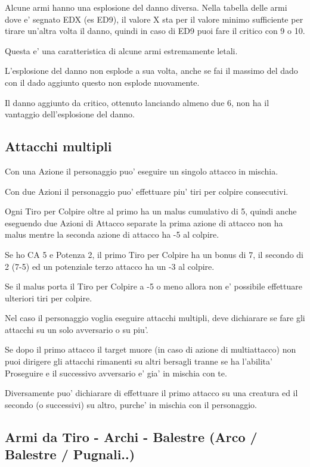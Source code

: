\documentclass[a4paper,11pt,twoside,openany]{book}
\begin{document}
Alcune armi hanno una esplosione del danno diversa. Nella tabella delle armi dove e' segnato EDX (es ED9), il valore X sta per il valore minimo sufficiente per tirare un'altra volta il danno, quindi in caso di ED9 puoi fare il critico con 9 o 10.

Questa e' una caratteristica di alcune armi estremamente letali.

L'esplosione del danno non esplode a sua volta, anche se fai il massimo del dado con il dado aggiunto questo non esplode nuovamente.

Il danno aggiunto da critico, ottenuto lanciando almeno due 6, non ha il vantaggio dell'esplosione del danno.

\subsection{Attacchi multipli}

Con una Azione il personaggio puo' eseguire un singolo attacco in mischia.

Con due Azioni il personaggio puo' effettuare piu' tiri per colpire consecutivi.

Ogni Tiro per Colpire oltre al primo ha un malus cumulativo di 5, quindi anche eseguendo due Azioni di Attacco separate la prima azione di attacco non ha malus mentre la seconda azione di attacco ha -5 al colpire.

Se ho CA 5 e Potenza 2, il primo Tiro per Colpire ha un bonus di 7, il secondo di 2 (7-5) ed un potenziale terzo attacco ha un -3 al colpire.

Se il malus porta il Tiro per Colpire a -5 o meno allora non e' possibile effettuare ulteriori tiri per colpire.

Nel caso il personaggio voglia eseguire attacchi multipli, deve dichiarare se fare gli attacchi su un solo avversario o su piu'.

Se dopo il primo attacco il target muore (in caso di azione di multiattacco) non puoi dirigere gli attacchi rimanenti su altri bersagli tranne se ha l'abilita' Proseguire e il successivo avversario e' gia' in mischia con te.

Diversamente puo' dichiarare di effettuare il primo attacco su una creatura ed il secondo (o successivi) su altro, purche' in mischia con il personaggio.

\subsection{Armi da Tiro - Archi - Balestre (Arco / Balestre / Pugnali..)}
\end{document}

